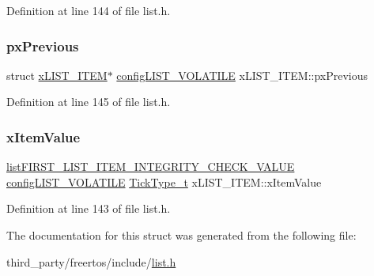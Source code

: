 Definition at line 144 of file list.\+h.

\mbox{\label{structxLIST__ITEM_ae8e553eae41010a8e41c66d76c94110b}} 
\subsubsection{\texorpdfstring{px\+Previous}{pxPrevious}}
{\footnotesize\ttfamily struct \hyperlink{structxLIST__ITEM}{x\+L\+I\+S\+T\+\_\+\+I\+T\+EM}$\ast$ \hyperlink{list_8h_a2d5de557c5561c8980d1bf51d87d8cba}{config\+L\+I\+S\+T\+\_\+\+V\+O\+L\+A\+T\+I\+LE} x\+L\+I\+S\+T\+\_\+\+I\+T\+E\+M\+::px\+Previous}



Definition at line 145 of file list.\+h.

\mbox{\label{structxLIST__ITEM_a9b1f26de79f9da1403ca3ebc7a2e653a}} 
\subsubsection{\texorpdfstring{x\+Item\+Value}{xItemValue}}
{\footnotesize\ttfamily \hyperlink{list_8h_a3611bd5d5d87cb26ac1dc7a4852b94a0}{list\+F\+I\+R\+S\+T\+\_\+\+L\+I\+S\+T\+\_\+\+I\+T\+E\+M\+\_\+\+I\+N\+T\+E\+G\+R\+I\+T\+Y\+\_\+\+C\+H\+E\+C\+K\+\_\+\+V\+A\+L\+UE} \hyperlink{list_8h_a2d5de557c5561c8980d1bf51d87d8cba}{config\+L\+I\+S\+T\+\_\+\+V\+O\+L\+A\+T\+I\+LE} \hyperlink{pic32mx_2portmacro_8h_aa69c48c6e902ce54f70886e6573c92a9}{Tick\+Type\+\_\+t} x\+L\+I\+S\+T\+\_\+\+I\+T\+E\+M\+::x\+Item\+Value}



Definition at line 143 of file list.\+h.



The documentation for this struct was generated from the following file\+:\begin{DoxyCompactItemize}
\item 
third\+\_\+party/freertos/include/\hyperlink{list_8h}{list.\+h}\end{DoxyCompactItemize}
